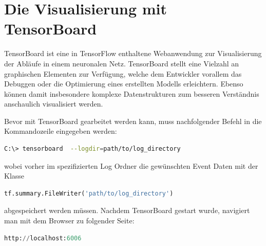\section{Die Visualisierung mit TensorBoard}

TensorBoard ist eine in TensorFlow enthaltene Webanwendung zur Visualisierung der Abläufe in einem neuronalen Netz. TensorBoard stellt eine Vielzahl an graphischen Elementen zur Verfügung, welche dem Entwickler vorallem das Debuggen oder die Optimierung eines erstellten Modells erleichtern. Ebenso können damit insbesondere komplexe Datenstrukturen zum besseren Verständnis anschaulich visualisiert werden. 

Bevor mit TensorBoard gearbeitet werden kann, muss nachfolgender Befehl in die Kommandozeile eingegeben werden:
\\

\begin{minipage}{\linewidth}
\begin{lstlisting}[language=bash, label={lst:tensorboard}]
C:\> tensorboard  --logdir=path/to/log_directory

\end{lstlisting}
\end{minipage}

\vspace{0.2cm}
wobei vorher im spezifizierten Log Ordner die gewünschten Event Daten mit der Klasse
\\

\begin{minipage}{\linewidth}
\begin{lstlisting}[language=Python, label={lst:FileWriter}]
tf.summary.FileWriter('path/to/log_directory')

\end{lstlisting}
\end{minipage}
\vspace{0.2cm}

abgespeichert werden müssen. Nachdem TensorBoard gestart wurde, navigiert man mit dem Browser zu folgender Seite:
\\

\begin{minipage}{\linewidth}
\begin{lstlisting}[language=Python, label={lst:localhost}]
http://localhost:6006

\end{lstlisting}
\end{minipage}
\vspace{0.2cm}

